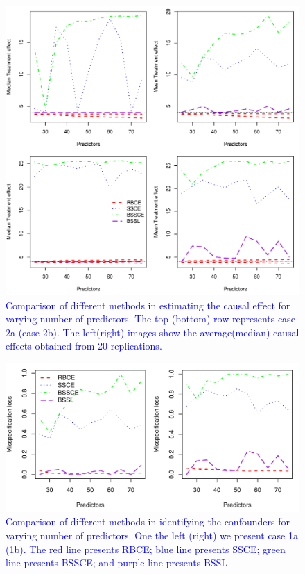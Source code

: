 \documentclass[preprint,12pt]{elsarticle}
\newcommand{\added}[1]{\textcolor{blue}{#1}}
\begin{document}
\begin{figure}[h]
	\centering
	\includegraphics[width = 0.85\linewidth]{treat_pred_rev.pdf}
	\caption{\added{Comparison of different methods in estimating the causal effect for varying number of predictors. The top (bottom) row represents case 2a (case 2b). The left(right) images show the average(median) causal effects obtained from 20 replications. }}
	\label{fig:comp:trt:pred}
\end{figure}

\begin{figure}[h]
	\centering
	\includegraphics[width = 0.9\linewidth]{loss_pred.pdf}
	\caption{\added{Comparison of different methods in identifying the confounders for varying number of predictors. One the left (right) we present case 1a (1b). The red line presents RBCE; blue line presents SSCE; green line presents BSSCE; and purple line
			presents BSSL}}
	\label{fig:comp:loss:pred}
\end{figure}
\end{document}
